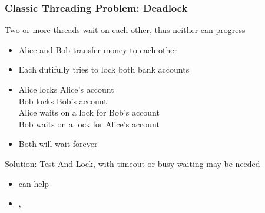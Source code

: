 \begin{slide}
\frametitle{Classic Threading Problem: Deadlock}

Two or more threads wait on each other, thus neither can progress
  \begin{itemize}
  \item Alice and Bob transfer money to each other
  \item Each dutifully tries to lock both bank accounts
  \item [] \vspace{0.5em}
  \footnotesize{Alice locks Alice's account} \\
  \hspace{1cm}\footnotesize{Bob locks Bob's account} \\
  \footnotesize{Alice waits on a lock for Bob's account} \\
  \hspace{1cm}\footnotesize{Bob waits on a lock for Alice's account} \\
  \item Both will wait forever
  \end{itemize}
\vspace{1em}
Solution: Test-And-Lock, with timeout or busy-waiting may be needed
\begin{itemize}
  \item {} can help
  \item {},
\end{itemize}

\end{slide}


